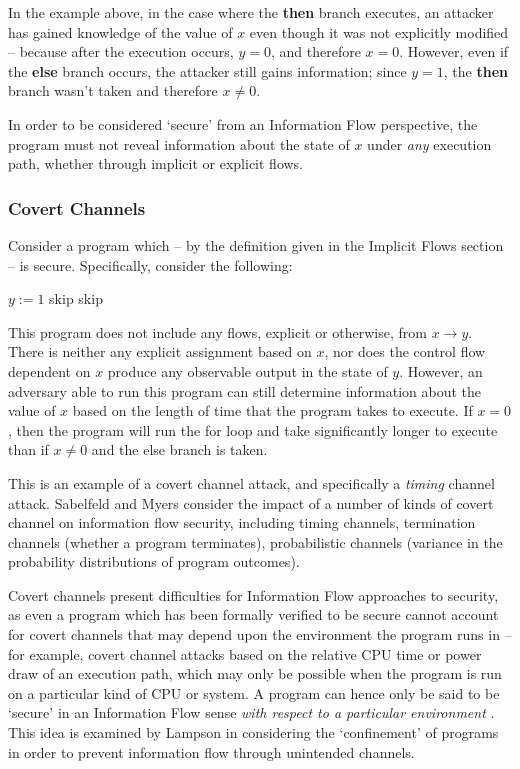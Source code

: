 In the example above, in the case where the \textbf{then} branch executes, an attacker has gained knowledge of the value of $ x $ even though it was not explicitly modified -- because after the execution occurs, $ y = 0 $, and therefore $ x = 0 $. However, even if the \textbf{else} branch occurs, the attacker still gains information; since $ y = 1 $, the \textbf{then} branch wasn't taken and therefore $ x \ne 0 $.

In order to be considered `secure' from an Information Flow perspective, the program must not reveal information about the state of $ x $ under \textit{any} execution path, whether through implicit or explicit flows.

\subsubsection{Covert Channels}

Consider a program which -- by the definition given in the Implicit Flows section -- is secure. Specifically, consider the following: 

\begin{algorithmic}
	\State $ y := 1 $
			\State skip
		\EndFor
	\Else
		\State skip
	\EndIf
\end{algorithmic}

This program does not include any flows, explicit or otherwise, from $ x \rightarrow y $. There is neither any explicit assignment based on $ x $, nor does the control flow dependent on $ x $ produce any observable output in the state of $ y $. However, an adversary able to run this program can still determine information about the value of $ x $ based on the length of time that the program takes to execute. If $ x = 0 $, then the program will run the for loop and take significantly longer to execute than if $ x \ne 0 $ and the else branch is taken.

This is an example of a covert channel attack, and specifically a \textit{timing} channel attack. Sabelfeld and Myers \cite{sabelfeld2003if} consider the impact of a number of kinds of covert channel on information flow security, including timing channels, termination channels (whether a program terminates), probabilistic channels (variance in the probability distributions of program outcomes).

Covert channels present difficulties for Information Flow approaches to security, as even a program which has been formally verified to be secure cannot account for covert channels that may depend upon the environment the program runs in -- for example, covert channel attacks based on the relative CPU time or power draw of an execution path, which may only be possible when the program is run on a particular kind of CPU or system. A program can hence only be said to be `secure' in an Information Flow sense \textit{with respect to a particular environment} \cite{sabelfeld2003if}. This idea is examined by Lampson \cite{lampson1973covertchannels} in considering the `confinement' of programs in order to prevent information flow through unintended channels.	

